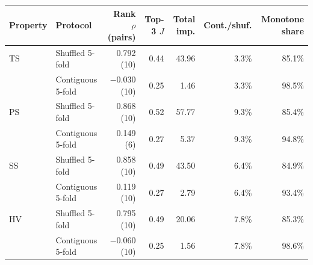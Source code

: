 \begin{tabular}{@{}llrrrrr@{}}
\toprule
Property & Protocol & Rank $\rho$ (pairs) & Top-3 $J$ & Total imp. & Cont./shuf. & Monotone share \\
\midrule
TS & Shuffled 5-fold & 0.792 (10) & 0.44 & 43.96 & 3.3\% & 85.1\% \\
 & Contiguous 5-fold & $-$0.030 (10) & 0.25 & 1.46 & 3.3\% & 98.5\% \\
PS & Shuffled 5-fold & 0.868 (10) & 0.52 & 57.77 & 9.3\% & 85.4\% \\
 & Contiguous 5-fold & 0.149 (6) & 0.27 & 5.37 & 9.3\% & 94.8\% \\
SS & Shuffled 5-fold & 0.858 (10) & 0.49 & 43.50 & 6.4\% & 84.9\% \\
 & Contiguous 5-fold & 0.119 (10) & 0.27 & 2.79 & 6.4\% & 93.4\% \\
HV & Shuffled 5-fold & 0.795 (10) & 0.49 & 20.06 & 7.8\% & 85.3\% \\
 & Contiguous 5-fold & $-$0.060 (10) & 0.25 & 1.56 & 7.8\% & 98.6\% \\
\bottomrule
\end{tabular}
